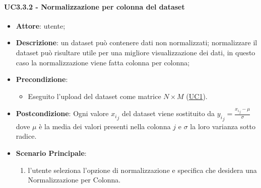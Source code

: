     \paragraph{UC3.3.2 - Normalizzazione per colonna del dataset}
    \label{uc5.2.2}
    \begin{itemize}
    \item \textbf{Attore}: utente;
    \item \textbf{Descrizione}: un dataset può contenere dati non normalizzati; normalizzare il dataset può risultare utile per una migliore visualizzazione dei dati, in questo caso la normalizzazione viene fatta colonna per colonna;
    \item \textbf{Precondizione}: 
    \begin{itemize}
        \item Eseguito l'upload del dataset come matrice $N\times M$ (\hyperref[uc1]{UC1}).
    \end{itemize}  
    \item \textbf{Postcondizione}: Ogni valore ${x_i}_j$ del dataset viene sostituito da $ {y_i}_j = \frac{{x_i}_j - \mu}{\sigma}$ dove $\mu$ è la media dei valori presenti nella colonna $j$ e $\sigma$ la loro varianza sotto radice.
    \item \textbf{Scenario Principale}: 
    \begin{enumerate}
        \item l'utente seleziona l'opzione di normalizzazione e specifica che desidera una Normalizzazione per Colonna. 
    \end{enumerate}  
    \end{itemize}
    
